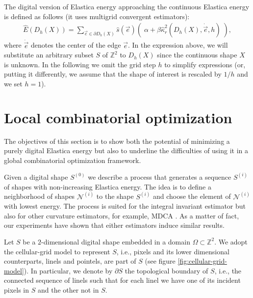 \documentclass[smallextended]{svjour3}       %
\begin{document}
The digital version of Elastica energy approaching the continuous Elastica energy is defined as follows (it uses multigrid convergent estimators):
\begin{align}
	\hat{E}( D_h(X) ) = \sum_{\vec{e} \in \partial D_h(X)}{ \hat{s}(\vec{e})\left(\; \alpha + \beta \hat{\kappa}_{r}^2(D_h(X),\dot{\vec{e}},h) \; \right)},
	\label{eq:digital-energy}
\end{align}
where $\dot{\vec{e}}$ denotes the center of the edge $\vec{e}$. In the
expression above, we will substitute an arbitrary subset $S$ of
$\mathbb{Z}^2$ to $D_h(X)$ since the continuous shape $X$ is unknown.
In the following we omit the grid step $h$ to simplify expressions
(or, putting it differently, we assume that the shape of interest is
rescaled by $1/h$ and we set $h=1$).

\section{Local combinatorial optimization}

The objectives of this section is to show both the potential of minimizing a purely digital Elastica energy but also to underline the difficulties of using it in a global combinatorial optimization framework.

Given a digital shape $S^{(0)}$ we describe a process that generates a
sequence $S^{(i)}$ of shapes with non-increasing Elastica energy. The
idea is to define a neighborhood of shapes $\mathcal{N}^{(i)}$ to the
shape $S^{(i)}$ and choose the element of $\mathcal{N}^{(i)}$ with
lowest energy.  The process is suited for the integral invariant
estimator but also for other curvature estimators, for example, MDCA
\cite{roussillon11mdca}. As a matter of fact, our experiments have
shown that either estimators induce similar results.

Let $S$ be a $2$-dimensional digital shape embedded in a domain $\Omega \subset \mathbb{Z}^2$. We adopt the cellular-grid model to represent $S$, i.e., pixels and its lower dimensional counterparts, linels and pointels, are part of $S$ (see figure \ref{fig:cellular-grid-model}). In particular, we denote by $\partial S$ the topological boundary of $S$, i.e., the connected sequence of linels such that for each linel we have one of its incident pixels in $S$ and the other not in $S$.
\end{document}

